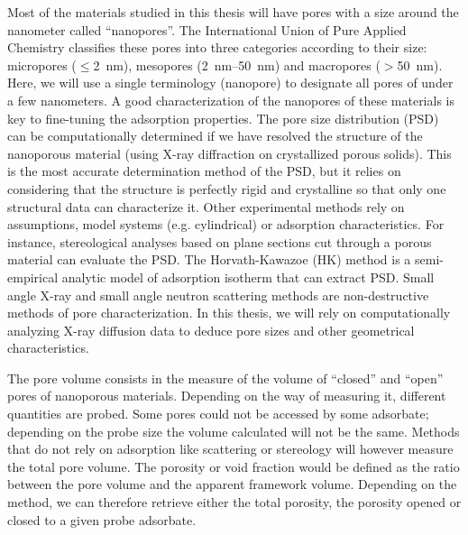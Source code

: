 \documentclass[main.tex]{subfiles}
\begin{document}
Most of the materials studied in this thesis will have pores with a size around the nanometer called ``nanopores''. The International Union of Pure Applied Chemistry classifies these pores into three categories according to their size: micropores ($\leq$\SI{2}{\nano\meter}), mesopores (\SI{2}{\nano\meter}--\SI{50}{\nano\meter}) and macropores ($>$\SI{50}{\nano\meter}).\cite{Sing_1985} Here,
we will use a single terminology (nanopore) to designate all pores of under a few nanometers. A good characterization of the nanopores of these materials is key to fine-tuning the adsorption properties.\cite{Yan_2020} The pore size distribution (PSD) can be computationally determined if we have resolved the structure of the nanoporous material (using X-ray diffraction on crystallized porous solids). This is the most accurate determination method of the PSD, but it relies on considering that the structure is perfectly rigid and crystalline so that only one structural data can characterize it. Other experimental methods rely on assumptions, model systems (e.g. cylindrical) or adsorption characteristics. For instance, stereological analyses based on plane sections cut through a porous material can evaluate the PSD.\cite{Haynes_1973} The Horvath-Kawazoe (HK) method is a semi-empirical analytic model of adsorption isotherm that can extract PSD. Small angle X-ray and small angle neutron scattering methods are non-destructive methods of pore characterization.\cite{Radlinski_2004} In this thesis, we will rely on computationally analyzing X-ray diffusion data to deduce pore sizes and other geometrical characteristics. 

The pore volume consists in the measure of the volume of ``closed'' and ``open'' pores of nanoporous materials. Depending on the way of measuring it, different quantities are probed. Some pores could not be accessed by some adsorbate; depending on the probe size the volume calculated will not be the same. Methods that do not rely on adsorption like scattering or stereology will however measure the total pore volume. The porosity or void fraction would be defined as the ratio between the pore volume and the apparent framework volume. Depending on the method, we can therefore retrieve either the total porosity, the porosity opened or closed to a given probe adsorbate. 

\end{document}
